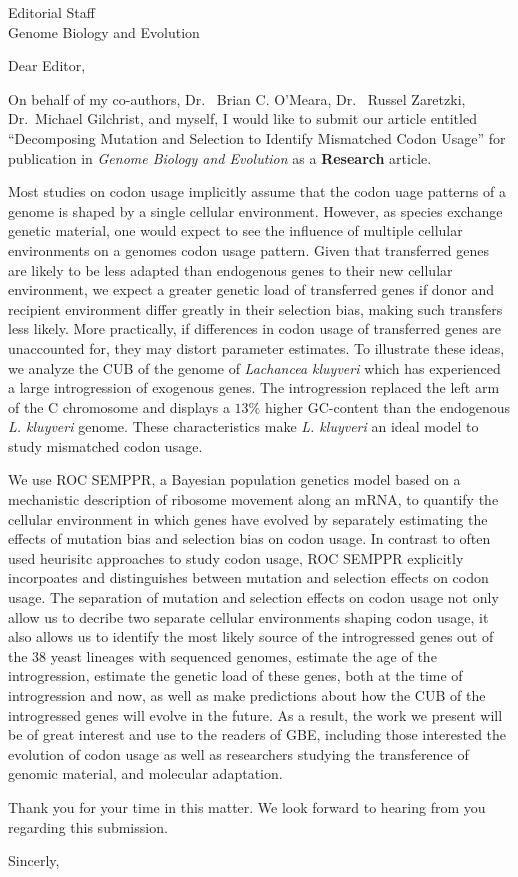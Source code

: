 \documentclass[11pt, letterpaper]{letter}
\begin{document}
\begin{letter}{Editorial Staff\\Genome Biology and Evolution}



\opening{Dear Editor,}

On behalf of my co-authors, Dr.~ Brian C. O'Meara, Dr.~ Russel Zaretzki, Dr.~Michael Gilchrist, and myself, I would like to submit our article entitled ``Decomposing Mutation and Selection to Identify Mismatched Codon Usage'' for publication in \emph{Genome Biology and Evolution} as a \textbf{Research} article. 

Most studies on codon usage implicitly assume that the codon uage patterns of a genome is shaped by a single cellular environment. 
However, as species exchange genetic material, one would expect to see the influence of multiple cellular environments on a genomes codon usage pattern.
Given that transferred genes are likely to be less adapted than endogenous genes to their new cellular environment, we expect a greater genetic load of transferred genes if donor and recipient environment differ greatly in their selection bias, making such transfers less likely.
More practically, if differences in codon usage of transferred genes are unaccounted for, they may distort parameter estimates.
To illustrate these ideas, we analyze the CUB of the genome of \emph{Lachancea kluyveri} which has experienced a large introgression of exogenous genes.
The introgression replaced the left arm of the C chromosome and displays a $13 \%$ higher GC-content than the endogenous \emph{L. kluyveri} genome.
These characteristics make \emph{L. kluyveri} an ideal model to study mismatched codon usage.

We use ROC SEMPPR, a Bayesian population genetics model based on a mechanistic description of ribosome movement along an mRNA, to quantify the cellular environment in which genes have evolved by separately estimating the effects of mutation bias and selection bias on codon usage.
In contrast to often used heurisitc approaches to study codon usage, ROC SEMPPR explicitly incorpoates and distinguishes between mutation and selection effects on codon usage.
The separation of mutation and selection effects on codon usage not only allow us to decribe two separate cellular environments shaping codon usage, it also allows us to identify the most likely source of the introgressed genes out of the 38 yeast lineages with sequenced genomes, estimate the age of the introgression, estimate the genetic load of these genes, both at the time of introgression and now, as well as make predictions about how the CUB of the introgressed genes will evolve in the future.
As a result, the work we present will be of great interest and use to the readers of GBE, including those interested the evolution of codon usage as well as researchers studying the transference of genomic material, and molecular adaptation.

Thank you for your time in this matter.
We look forward to hearing from you regarding this submission.

\closing{Sincerly,}

\end{letter}
\end{document}
